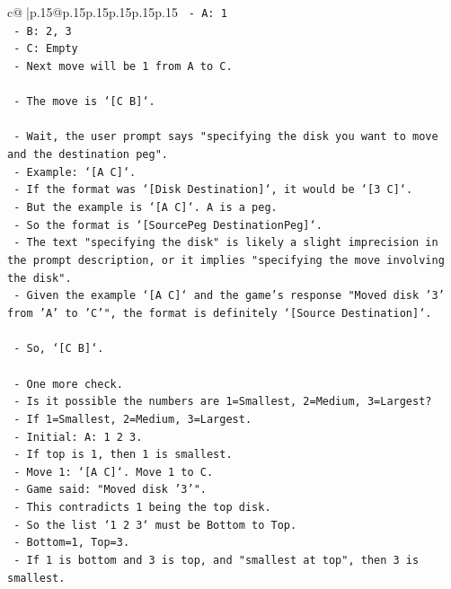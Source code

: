 \documentclass{article}
\begin{document}
{\begin{supertabular}{c@{$\;$}|p{.15\linewidth}@{}p{.15\linewidth}p{.15\linewidth}p{.15\linewidth}p{.15\linewidth}p{.15\linewidth}}
{{{\texttt{  {-} A: 1} \\
\texttt{  {-} B: 2, 3} \\
\texttt{  {-} C: Empty} \\
\texttt{  {-} Next move will be 1 from A to C.} \\
\\ 
\texttt{  {-} The move is `{[}C B{]}`.} \\
\\ 
\texttt{  {-} Wait, the user prompt says "specifying the disk you want to move and the destination peg".} \\
\texttt{  {-} Example: `{[}A C{]}`.} \\
\texttt{  {-} If the format was `{[}Disk Destination{]}`, it would be `{[}3 C{]}`.} \\
\texttt{  {-} But the example is `{[}A C{]}`. A is a peg.} \\
\texttt{  {-} So the format is `{[}SourcePeg DestinationPeg{]}`.} \\
\texttt{  {-} The text "specifying the disk" is likely a slight imprecision in the prompt description, or it implies "specifying the move involving the disk".} \\
\texttt{  {-} Given the example `{[}A C{]}` and the game's response "Moved disk '3' from 'A' to 'C'", the format is definitely `{[}Source Destination{]}`.} \\
\\ 
\texttt{  {-} So, `{[}C B{]}`.} \\
\\ 
\texttt{  {-} One more check.} \\
\texttt{  {-} Is it possible the numbers are 1=Smallest, 2=Medium, 3=Largest?} \\
\texttt{  {-} If 1=Smallest, 2=Medium, 3=Largest.} \\
\texttt{  {-} Initial: A: 1 2 3.} \\
\texttt{  {-} If top is 1, then 1 is smallest.} \\
\texttt{  {-} Move 1: `{[}A C{]}`. Move 1 to C.} \\
\texttt{  {-} Game said: "Moved disk '3'".} \\
\texttt{  {-} This contradicts 1 being the top disk.} \\
\texttt{  {-} So the list `1 2 3` must be Bottom to Top.} \\
\texttt{  {-} Bottom=1, Top=3.} \\
\texttt{  {-} If 1 is bottom and 3 is top, and "smallest at top", then 3 is smallest.} \\
}}}
\end{supertabular}}
\end{document}
